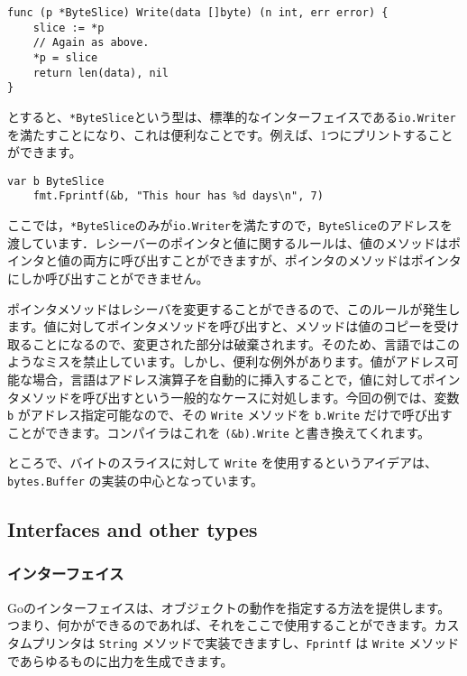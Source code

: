 \documentclass{jsarticle}
\begin{document}
\begin{lstlisting}[numbers=none]
func (p *ByteSlice) Write(data []byte) (n int, err error) {
    slice := *p
    // Again as above.
    *p = slice
    return len(data), nil
}
\end{lstlisting}

とすると、\texttt{*ByteSlice}という型は、標準的なインターフェイスである\texttt{io.Writer}を満たすことになり、これは便利なことです。例えば、1つにプリントすることができます。

\begin{lstlisting}[numbers=none]
    var b ByteSlice
    fmt.Fprintf(&b, "This hour has %d days\n", 7)
\end{lstlisting}

ここでは，\texttt{*ByteSlice}のみが\texttt{io.Writer}を満たすので，\texttt{ByteSlice}のアドレスを渡しています．レシーバーのポインタと値に関するルールは、値のメソッドはポインタと値の両方に呼び出すことができますが、ポインタのメソッドはポインタにしか呼び出すことができません。

ポインタメソッドはレシーバを変更することができるので、このルールが発生します。値に対してポインタメソッドを呼び出すと、メソッドは値のコピーを受け取ることになるので、変更された部分は破棄されます。そのため、言語ではこのようなミスを禁止しています。しかし、便利な例外があります。値がアドレス可能な場合，言語はアドレス演算子を自動的に挿入することで，値に対してポインタメソッドを呼び出すという一般的なケースに対処します。今回の例では、変数
\texttt{b} がアドレス指定可能なので、その \texttt{Write} メソッドを
\texttt{b.Write} だけで呼び出すことができます。コンパイラはこれを
\texttt{(\&b).Write} と書き換えてくれます。

ところで、バイトのスライスに対して \texttt{Write}
を使用するというアイデアは、\texttt{bytes.Buffer}
の実装の中心となっています。

\subsection{Interfaces and other types}

\subsubsection{インターフェイス}

Goのインターフェイスは、オブジェクトの動作を指定する方法を提供します。つまり、何かができるのであれば、それをここで使用することができます。カスタムプリンタは
\texttt{String} メソッドで実装できますし、\texttt{Fprintf} は
\texttt{Write} メソッドであらゆるものに出力を生成できます。
\end{document}
